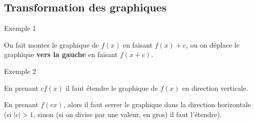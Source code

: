 \documentclass{article}
\begin{document}
\subsection{Transformation des graphiques}
\begin{parag}{Exemple 1}

    On fait monter le graphique de $f\left(x\right)$ en faisant $f\left(x\right) + c$, ou on déplace le graphique \textbf{vers la gauche} en faisant $f\left(x + c\right)$.
\end{parag}

\begin{parag}{Exemple 2}

    En prenant $cf\left(x\right)$ il faut étendre le graphique de $f\left(x\right)$ en direction verticale. 

    En prenant $f\left(cx\right)$, alors il faut serrer le graphique dans la direction horizontale (si $\left|c\right| > 1$, sinon (si on divise par une valeur, en gros) il faut l'étendre). 
\end{parag}
\end{document}
